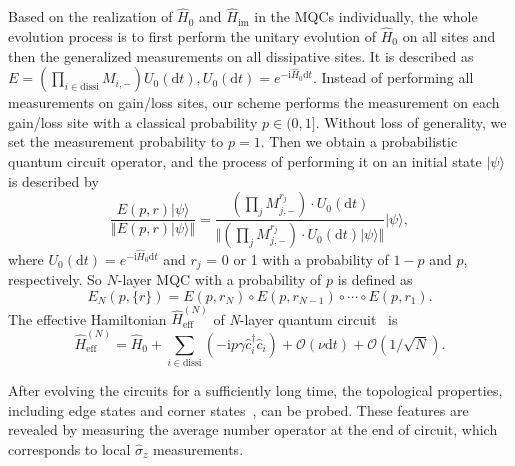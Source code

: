 \documentclass[longbibliography, aps, prx, amsmath, amssymb, amsfonts, twocolumn,superscriptaddress, footinbib]{revtex4-1}
\begin{document}
	Based on the realization of $\hat{H}_0$ and $\hat{H}_{\text{im}}$ in the MQCs individually, the whole evolution process is to first perform the unitary evolution of $\hat{H}_0$ on all sites and then the generalized measurements on all dissipative sites. It is described as $E=(\prod_{i\in \text{dissi}} M_{i,-}) U_{0}(\mathrm{d} t),U_{0}(\mathrm{d}t)=e^{-\mathrm{i}\hat{H}_0 \mathrm{d}t}$.
	Instead of performing all measurements on gain/loss sites, our scheme performs the measurement on each gain/loss site with a classical probability $p\in(0,1]$. 
	Without loss of generality, we set the measurement probability to $p=1$. 
	Then we obtain a probabilistic quantum circuit operator, and the process of performing it on an initial state $\vert \psi \rangle$ is described by
	\begin{equation}
		\frac{E(p,r) \vert \psi \rangle}{\Vert E(p,r) \vert \psi \rangle \Vert} = \frac{(\prod_j M_{j,-}^{r_j}) \cdot U_0(\mathrm{d}t)}{\Vert (\prod_j M_{j,-}^{r_j}) \cdot U_0(\mathrm{d}t) \vert \psi \rangle \Vert} \vert \psi \rangle,
	\end{equation}
	where $U_0(\mathrm{d} t) = e^{-\mathrm{i}\hat{H}_0 \mathrm{d} t}$ and $r_j$ = 0 or 1 with a probability of $1-p$ and $p$, respectively. So $N$-layer MQC with a probability of $p$ is defined as
	\begin{equation}
		E_N(p,\{r\}) = E(p, r_N) \circ E(p, r_{N-1}) \circ \cdots \circ E(p, r_1).
	\end{equation}
	The effective Hamiltonian $\hat{H}_{\text{eff}}^{(N)}$ of \textit{N}-layer quantum circuit~\cite{fleckenstein2022non} is 
	\begin{equation}
		\hat{H}^{(N)}_{\text{eff}} = \hat{H}_0 + \sum_{i\in \text{dissi} } (-\mathrm{i} p\gamma \hat{c}_i^{\dagger} \hat{c}_i) + \mathcal{O}(\nu\mathrm{d} t) + \mathcal{O}(1/\sqrt{N}).\label{eq:H_scheme1}
	\end{equation}

	After evolving the circuits for a sufficiently long time, the topological properties, including edge states and corner states~\cite{zou2021observation,shen2025observation}, can be probed. These features are revealed by measuring the average number operator at the end of circuit, which corresponds to local $\hat{\sigma}_z$ measurements. 
\end{document}
